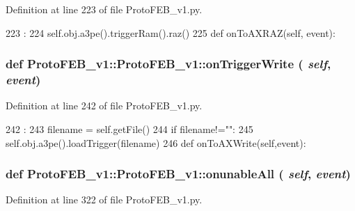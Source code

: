 Definition at line 223 of file ProtoFEB\_\-v1.py.


\begin{DoxyCode}
223                                  :
224         self.obj.a3pe().triggerRam().raz()
225 
    def onToAXRAZ(self, event):
\end{DoxyCode}
\hypertarget{classProtoFEB__v1_1_1ProtoFEB__v1_a2efd32e4383318561fce2e2625f781c7}{
\subsubsection[{onTriggerWrite}]{\setlength{\rightskip}{0pt plus 5cm}def ProtoFEB\_\-v1::ProtoFEB\_\-v1::onTriggerWrite ( {\em self}, \/   {\em event})}}
\label{classProtoFEB__v1_1_1ProtoFEB__v1_a2efd32e4383318561fce2e2625f781c7}


Definition at line 242 of file ProtoFEB\_\-v1.py.


\begin{DoxyCode}
242                                   :
243         filename = self.getFile()
244         if filename!="":
245             self.obj.a3pe().loadTrigger(filename)
246 
    def onToAXWrite(self,event):
\end{DoxyCode}
\hypertarget{classProtoFEB__v1_1_1ProtoFEB__v1_a6714bcd84bd82ab146d2f1a0862386e8}{
\subsubsection[{onunableAll}]{\setlength{\rightskip}{0pt plus 5cm}def ProtoFEB\_\-v1::ProtoFEB\_\-v1::onunableAll ( {\em self}, \/   {\em event})}}
\label{classProtoFEB__v1_1_1ProtoFEB__v1_a6714bcd84bd82ab146d2f1a0862386e8}


Definition at line 322 of file ProtoFEB\_\-v1.py.



